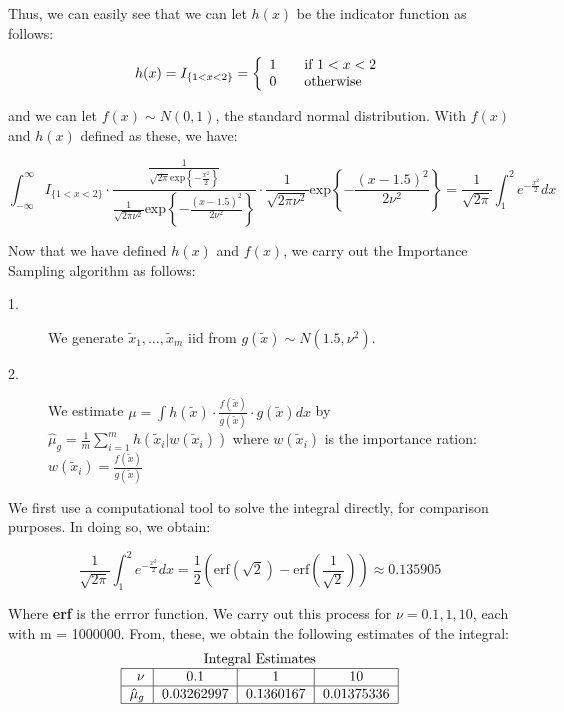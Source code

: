 \documentclass[12pt]{article}
\newcommand{\ex}{\mathrm{exp}}
\begin{document}
\begin{description}
Thus, we can easily see that we can let $h(x)$ be the indicator function as follows:

\[ h(x) = I_{\{1 < x < 2\}} = \left\{ 
\begin{array}{l l}
1 & \quad \text{if } 1 < x < 2\\
0 & \quad \text{otherwise}
\end{array} \right.\]

and we can let $f(x) \sim N(0, 1)$, the standard normal distribution. With $f(x)$ and $h(x)$ defined as these, we have:

\[\int_{-\infty}^{\infty} I_{\{1 < x < 2\}}\cdot \frac{\frac{1}{\sqrt{2\pi} \ex \left \{ -\frac{x^2}{2}\right\}}}{\frac{1}{\sqrt{2\pi \nu^2}} \ex\left\{ -\frac{(x - 1.5)^2}{2 \nu^2}\right\}} \cdot  \frac{1}{\sqrt{2\pi \nu^2}} \ex\left\{ -\frac{(x - 1.5)^2}{2 \nu^2}\right\}=\frac{1}{\sqrt{2\pi}} \int_1^2 e^{-\frac{x^2}{2}}dx\]

Now that we have defined $h(x)$ and $f(x)$, we carry out the Importance Sampling algorithm as follows:
\begin{description}
\item[1.] We generate $\tilde{x}_1, \dots, \tilde{x}_m$ iid from $g(\tilde{x}) \sim N(1.5, \nu^2)$.
\item[2.] We estimate $\mu = \int h(\tilde{x}) \cdot \frac{f(\tilde{x})}{g(\tilde{x})} \cdot g(\tilde{x}) dx$ by $\hat{\mu}_g = \frac{1}{m} \sum_{i=1}^m h(\tilde{x}_i | w(\tilde{x}_i))$ where $w(\tilde{x}_i)$ is the importance ration: $w(\tilde{x}_i) = \frac{f(\tilde{x})}{g(\tilde{x})}$
\end{description}

We first use a computational tool to solve the integral directly, for comparison purposes. In doing so, we obtain:

\[\frac{1}{\sqrt{2\pi}} \int_1^2 e^{-\frac{x^2}{2}}dx = \frac{1}{2} \left( \mathrm{erf}(\sqrt{2}) - \mathrm{erf}\left(\frac{1}{\sqrt{2}} \right) \right) \approx 0.135905\]

Where \textbf{erf} is the errror function. 
We carry out this process for $\nu = 0.1, 1, 10$, each with m = 1000000. From, these, we obtain the following estimates of the integral:
\[
\begin{tabular}{| r | c | c | c |}
\multicolumn{4}{c}{Integral Estimates} \\
\hline
$\nu$ & 0.1 & 1 & 10 \\
\hline
$\hat{\mu}_g$ & 0.03262997 & 0.1360167 & 0.01375336\\
\hline
\end{tabular}\]


\end{description}
\end{document}

